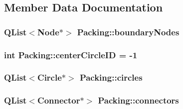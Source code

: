 \subsection{Member Data Documentation}
\hypertarget{class_packing_a5b34c744eb2032be00bee06064fbb9d6}{}
\subsubsection[{boundary\+Nodes}]{\setlength{\rightskip}{0pt plus 5cm}Q\+List$<${\bf Node}$\ast$$>$ Packing\+::boundary\+Nodes\hspace{0.3cm}{\ttfamily [protected]}}\label{class_packing_a5b34c744eb2032be00bee06064fbb9d6}
\hypertarget{class_packing_ad3ad2425f1ee067444ce424702bb3976}{}
\subsubsection[{center\+Circle\+I\+D}]{\setlength{\rightskip}{0pt plus 5cm}int Packing\+::center\+Circle\+I\+D = -\/1}\label{class_packing_ad3ad2425f1ee067444ce424702bb3976}
\hypertarget{class_packing_a60d1a498ccedd7c939ec9fb7e681fbaa}{}
\subsubsection[{circles}]{\setlength{\rightskip}{0pt plus 5cm}Q\+List$<${\bf Circle}$\ast$$>$ Packing\+::circles\hspace{0.3cm}{\ttfamily [protected]}}\label{class_packing_a60d1a498ccedd7c939ec9fb7e681fbaa}
\hypertarget{class_packing_aaad204ad5222b559bc1515308eb2a275}{}
\subsubsection[{connectors}]{\setlength{\rightskip}{0pt plus 5cm}Q\+List$<${\bf Connector}$\ast$$>$ Packing\+::connectors\hspace{0.3cm}{\ttfamily [protected]}}\label{class_packing_aaad204ad5222b559bc1515308eb2a275}
\hypertarget{class_packing_a147cc720a45cfe1a2ba9cb6a7572ea3c}{}
